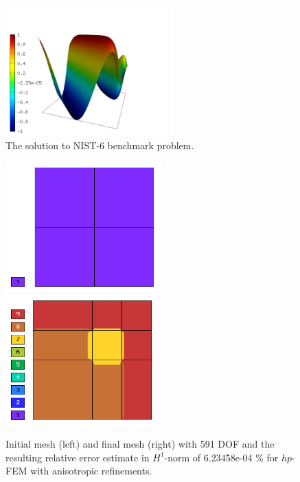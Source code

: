 \documentclass[12pt]{elsarticle}
\begin{document}
\begin{figure}[!ht]
\centering
\includegraphics[height=5cm]{nist/nist-6/solution.png}
\caption{The solution to NIST-6 benchmark problem.}
\label{fig:sln-nist06}
\end{figure}

\begin{figure}[!ht]
\centering
\includegraphics[height=5cm]{nist/nist-6/mesh_hp_aniso_init.png}\ \
\includegraphics[height=5cm]{nist/nist-6/mesh_hp_aniso.png}
\caption{Initial mesh (left) and final mesh (right) with 591 DOF and the resulting relative error estimate in $H^1$-norm of 6.23458e-04 \% for $hp$-FEM with anisotropic refinements.}
\label{fig:nist-6-hp-aniso}
\end{figure}
\end{document}
